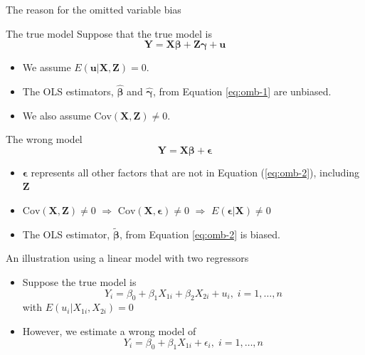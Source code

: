 \documentclass[presentation,10pt]{beamer}
\newcommand{\cov}{\mathrm{Cov}}
\begin{document}
\begin{frame}[shrink,plain,label={sec:org5a64027}]{The reason for the omitted variable bias}
\begin{block}{The true model}
Suppose that the true model is
\begin{equation}
\label{eq:omb-1}
\mathbf{Y} = \mathbf{X}\boldsymbol{\beta} + \mathbf{Z}\boldsymbol{\gamma} + \mathbf{u}
\end{equation}
\begin{itemize}
\item We assume \(E(\mathbf{u} | \mathbf{X}, \mathbf{Z}) = 0\).
\item The OLS estimators, \(\hat{\boldsymbol{\beta}}\) and
\(\hat{\boldsymbol{\gamma}}\), from Equation \eqref{eq:omb-1} are unbiased.
\item We also assume \(\cov(\mathbf{X}, \mathbf{Z}) \neq 0\).
\end{itemize}
\end{block}

\begin{block}{The wrong model}
\begin{equation}
\label{eq:omb-2}
\mathbf{Y} = \mathbf{X}\boldsymbol{\beta} + \boldsymbol{\epsilon}
\end{equation}

\begin{itemize}
\item \(\boldsymbol{\epsilon}\) represents all other factors that are not
in Equation (\ref{eq:omb-2}), including \(\mathbf{Z}\)
\item \(\cov(\mathbf{X}, \mathbf{Z}) \neq 0\) \(\Rightarrow\) \(\cov(\mathbf{X},
  \boldsymbol{\epsilon}) \neq 0\) \(\Rightarrow\)
\(E(\boldsymbol{\epsilon} | \mathbf{X}) \neq 0\)
\item The OLS estimator, \(\tilde{\boldsymbol{\beta}}\), from Equation
\eqref{eq:omb-2} is biased.
\end{itemize}
\end{block}
\end{frame}

\begin{frame}[label={sec:org3d6f3aa}]{An illustration using a linear model with two regressors}
\begin{itemize}
\item Suppose the true model is
\[ Y_i = \beta_0 + \beta_1 X_{1i} + \beta_2 X_{2i} + u_i,\; i=1,
  \ldots, n \]
with \(E(u_i | X_{1i}, X_{2i}) = 0\)

\item However, we estimate a wrong model of
\[ Y_i = \beta_0 + \beta_1 X_{1i} + \epsilon_i,\; i=1, \ldots, n \]
\end{itemize}
\end{frame}
\end{document}
